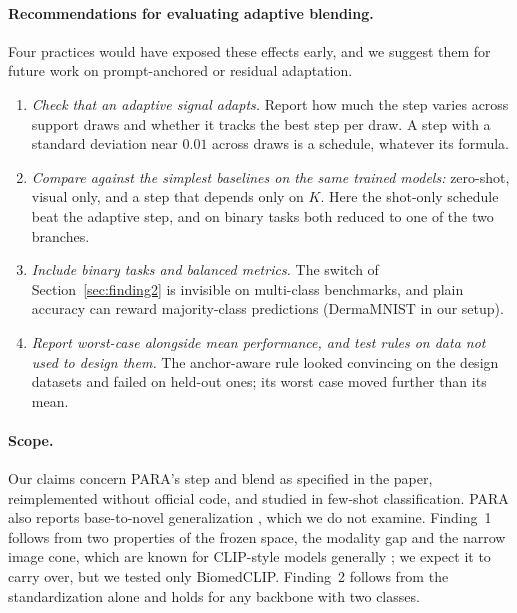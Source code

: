 \paragraph{Recommendations for evaluating adaptive blending.}
Four practices would have exposed these effects early, and we suggest them for future work on prompt-anchored or residual adaptation.
\begin{enumerate}
  \item \emph{Check that an adaptive signal adapts.} Report how much the step varies across support draws and whether it tracks the best step per draw.
  A step with a standard deviation near $0.01$ across draws is a schedule, whatever its formula.
  \item \emph{Compare against the simplest baselines on the same trained models:} zero-shot, visual only, and a step that depends only on $K$.
  Here the shot-only schedule beat the adaptive step, and on binary tasks both reduced to one of the two branches.
  \item \emph{Include binary tasks and balanced metrics.} The switch of Section~\ref{sec:finding2} is invisible on multi-class benchmarks,
  and plain accuracy can reward majority-class predictions (DermaMNIST in our setup).
  \item \emph{Report worst-case alongside mean performance, and test rules on data not used to design them.}
  The anchor-aware rule looked convincing on the design datasets and failed on held-out ones;
  its worst case moved further than its mean.
\end{enumerate}

\paragraph{Scope.}
Our claims concern PARA's step and blend as specified in the paper, reimplemented without official code, and studied in few-shot classification.
PARA also reports base-to-novel generalization \citep{kang2026para}, which we do not examine.
Finding~1 follows from two properties of the frozen space, the modality gap and the narrow image cone, which are known for CLIP-style models generally \citep{liang2022mind};
we expect it to carry over, but we tested only BiomedCLIP.
Finding~2 follows from the standardization alone and holds for any backbone with two classes.

